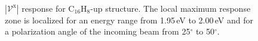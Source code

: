 \documentclass[prb,11pt,tightenlines,twocolumn,aps]{revtex4-1}
\begin{document}
\begin{figure}[t]
    \centering
    \\
    \caption{$|\mathcal{V}^{\mathrm{x}}|$ response for C$_{16}$H$_{8}$-up
    structure. The local maximum response zone is localized for an energy range
    from 1.95\,eV to 2.00\,eV and for a polarization angle of the incoming beam
    from 25$^{\circ}$ to 50$^{\circ}$.}
    \label{fig:up-3d-2}
\end{figure}
\end{document}
